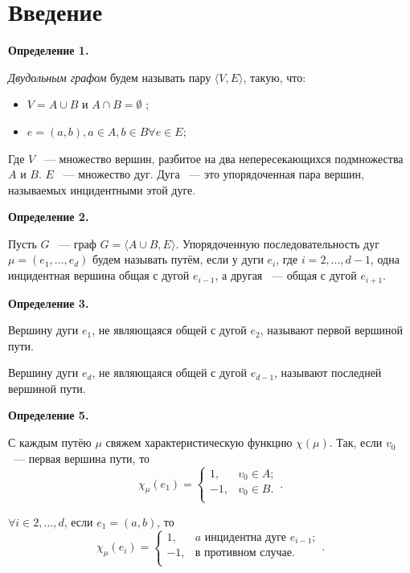 \documentclass[14pt]{mmcs-article}
\begin{document}
\section*{Введение}

\textbf{Определение 1.}

\textsl{Двудольным графом} будем называть пару $\langle V,E \rangle$, такую, что:

\begin{itemize}
    \item $V = A \cup B$ и $A \cap B = \emptyset$ ;
    \item $e = (a, b), a \in A, b \in B \forall e \in E$;
\end{itemize}

Где $V$ ~--- множество вершин, разбитое на два непересекающихся подмножества $A$ и $B$.
$E$ ~--- множество дуг. Дуга ~--- это упорядоченная пара вершин, называемых инцидентными этой дуге.

\textbf{Определение 2.}


Пусть $G$ ~--- граф $G = \langle A \cup B, E \rangle$.
Упорядоченную последовательность дуг $\mu = (e_1, ..., e_d)$ будем называть путём, если у дуги $e_i$, где $i = 2, ..., d-1$, одна инцидентная вершина общая с дугой $e_{i-1}$, а другая ~--- общая с дугой $e_{i+1}$.

\textbf{Определение 3.}

Вершину дуги $e_1$, не являющаяся общей с дугой $e_2$, называют первой вершиной пути.

Вершину дуги $e_d$, не являющаяся общей с дугой $e_{d-1}$, называют последней вершиной пути.

\textbf{Определение 5.}

С каждым путёю $\mu$ свяжем характеристическую функцию $\chi(\mu)$.
Так, если $v_0$ ~--- первая вершина пути, то
\[
    \chi_{\mu}(e_1) =
    \left\{
        \begin{array}{ll}
        1,  & v_0 \in A;\\
        -1, & v_0 \in B. \\
        \end{array}
    \right..
\]

$\forall i \in 2, ..., d$, если $e_1 = (a, b)$, то
\[
    \chi_{\mu}(e_i) =
    \left\{
        \begin{array}{ll}
        1,  & a \text{ инцидентна дуге } e_{i-1};\\
        -1, & \text{в противном случае}. \\
        \end{array}
    \right..
\]
\end{document}
